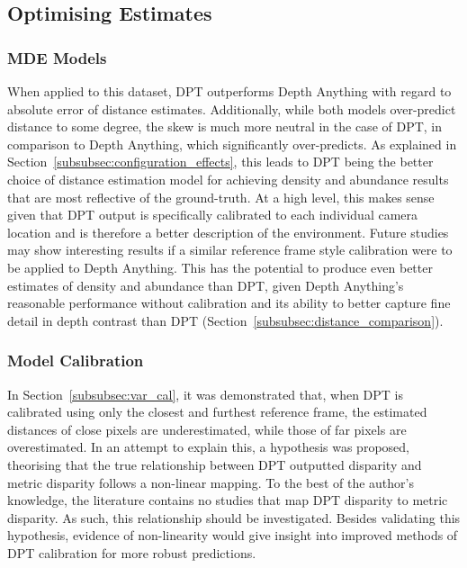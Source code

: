 \subsection{Optimising Estimates}

\subsubsection{MDE Models}

When applied to this dataset, DPT outperforms Depth Anything with regard to absolute error of
distance estimates.
Additionally, while both models over-predict distance to some degree, the skew is much more
neutral in the case of DPT, in comparison to Depth Anything, which significantly over-predicts.
As explained in Section~\ref{subsubsec:configuration_effects}, this leads to DPT being the
better choice of distance estimation model for achieving density and abundance results that are
most reflective of the ground-truth.
At a high level, this makes sense given that DPT output is specifically calibrated
to each individual camera location and is therefore a better description of the environment.
Future studies may show interesting results if a similar reference frame style calibration
were to be applied to Depth Anything.
This has the potential to produce even better estimates of density and abundance than DPT,
given Depth Anything's reasonable performance without calibration and its ability to better
capture fine detail in depth contrast than DPT (Section~\ref{subsubsec:distance_comparison}).

\subsubsection{Model Calibration}

In Section~\ref{subsubsec:var_cal}, it was demonstrated that, when DPT is calibrated using
only the closest and furthest reference frame, the estimated distances of close pixels are
underestimated, while those of far pixels are overestimated.
In an attempt to explain this, a hypothesis was proposed, theorising that the true relationship
between DPT outputted disparity and metric disparity follows a non-linear mapping.
To the best of the author's knowledge, the literature contains no studies that map
DPT disparity to metric disparity.
As such, this relationship should be investigated.
Besides validating this hypothesis, evidence of non-linearity would give insight into improved
methods of DPT calibration for more robust predictions.

